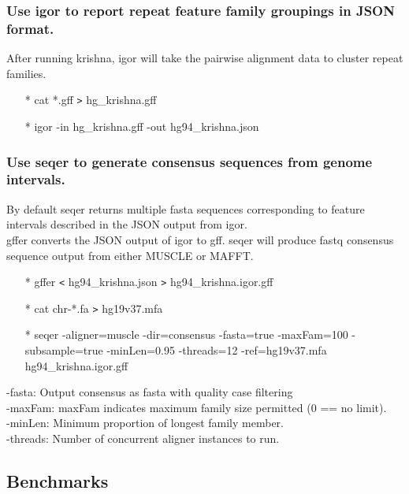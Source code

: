 \documentclass[12pt]{report}
\begin{document}
\subsubsection*{Use igor to report repeat feature family groupings in JSON format.}

After running krishna, igor will take the pairwise alignment data to cluster repeat families.
\begin{enumerate}
	\item[*] cat *.gff \texttt{>} hg\_krishna.gff
	\item[*] igor -in hg\_krishna.gff -out hg94\_krishna.json
\end{enumerate}

\subsubsection*{Use seqer to generate consensus sequences from genome intervals.}
By default seqer returns multiple fasta sequences corresponding to feature intervals described in the JSON output from igor. \\

gffer converts the JSON output of igor to gff. seqer will produce fastq consensus sequence output from either MUSCLE or MAFFT. 

\begin{enumerate}
	\item[*] gffer \texttt{<} hg94\_krishna.json \texttt{>} hg94\_krishna.igor.gff
	\item[*] cat chr-*.fa \texttt{>} hg19v37.mfa
	\item[*] seqer -aligner=muscle -dir=consensus -fasta=true -maxFam=100 -subsample=true -minLen=0.95 -threads=12 -ref=hg19v37.mfa hg94\_krishna.igor.gff
\end{enumerate}

\noindent -fasta: Output consensus as fasta with quality case filtering\\
-maxFam: maxFam indicates maximum family size permitted (0 == no limit).\\
-minLen: Minimum proportion of longest family member.\\
-threads: Number of concurrent aligner instances to run.


\subsection*{Benchmarks}
\end{document}
